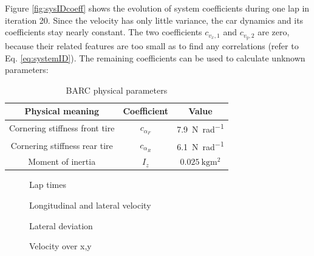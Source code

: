 Figure \ref{fig:sysIDcoeff} shows the evolution of system coefficients during one lap in iteration 20. Since the velocity has only little variance, the car dynamics and its coefficients stay nearly constant. The two coefficients $c_{v_x,1}$ and $c_{v_y,2}$ are zero, because their related features are too small as to find any correlations (refer to Eq. \eqref{eq:systemID}). The remaining coefficients can be used to calculate unknown parameters:
\begin{table}[h!]
\centering
\caption{BARC physical parameters}
\begin{tabular}{c|c|c}
Physical meaning & Coefficient & Value\\
\hline
Cornering stiffness front tire & $c_{\alpha_F}$ & \SI{7.9}{\newton\per\radian}\\
Cornering stiffness rear tire & $c_{\alpha_R}$ & \SI{6.1}{\newton\per\radian}\\
Moment of inertia & $I_z$ & $\SI{0.025}{\kilo\gram\square\meter}$
\end{tabular}
\end{table}


\begin{figure}[ht]
    \centering
      
    \caption{Lap times}
    \label{fig:exp_lapTime}
\end{figure}

\begin{figure}[ht]
    \centering
      
    \caption{Longitudinal and lateral velocity}
    \label{fig:exp_v}
\end{figure}

\begin{figure}[ht]
    \centering
      
    \caption{Lateral deviation}
    \label{fig:exp_e_Y}
\end{figure}

\begin{figure}[ht]
    \centering
      
    \caption{Velocity over x,y}
    \label{fig:exp_v_over_xy}
\end{figure}

